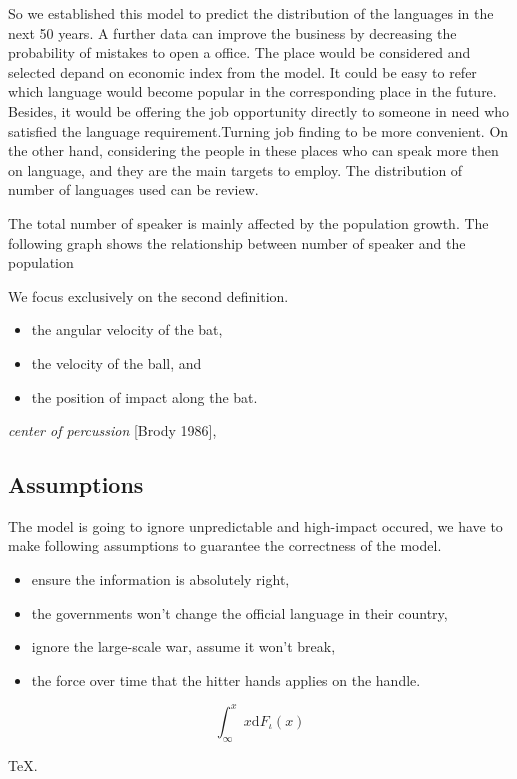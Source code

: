 \documentclass{mcmthesis}
\begin{document}
So we established this model to predict the distribution of the languages in the next 50 years. A further data can improve the business by decreasing
the probability of mistakes to open a office. The place would be considered and selected depand on economic index from the model.
It could be easy to refer which language would become popular in the corresponding place in the future. Besides,
it would be offering the job opportunity directly to someone in need who satisfied the language requirement.Turning job finding to be more convenient.
On the other hand, considering the people in these places who can speak more then on language, and they are the 
main targets to employ. The distribution of number of languages used can be review.
 
 



The total number of speaker is mainly affected by the population growth. The following graph shows the relationship between number of speaker and the population


We focus exclusively on the second definition.


\begin{itemize}
\item the angular velocity of the bat,
\item the velocity of the ball, and
\item the position of impact along the bat.
\end{itemize}

\emph{center of percussion} [Brody 1986],

\subsection{Assumptions}
\qquad The model is going to ignore unpredictable and high-impact occured, we have to make following assumptions to guarantee the correctness of the model.
\begin{itemize}
\item ensure the information is absolutely right, 
\item the governments won't change the official language in their country,
\item ignore the large-scale war, assume it won't break,
\item the force over time that the hitter hands applies on the handle.
\end{itemize}


\begin{Theorem} \label{thm:latex}
\begin{equation}\int^x_\infty x \mathrm{d}F_\iota(x)
\end{equation}
\end{Theorem}
\begin{Lemma} \label{thm:tex}
\TeX .
\end{Lemma}
\end{document}
